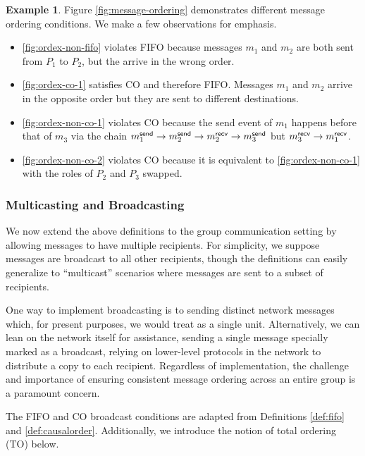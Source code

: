 \documentclass[]             %
{NASA}                       %
\theoremstyle{definition}
\newtheorem{example}[theorem]{Example}
\providecommand{\tightlist}{%
  \setlength{\itemsep}{0pt}\setlength{\parskip}{0pt}}
\begin{document}
\begin{example}
  Figure \ref{fig:message-ordering} demonstrates different message
  ordering conditions. We make a few observations for emphasis.

  \begin{itemize}
    \tightlist
  \item \ref{fig:ordex-non-fifo} violates FIFO because messages $m_1$
    and $m_2$ are both sent from $P_1$ to $P_2$, but the arrive in the wrong order.
  \item \ref{fig:ordex-co-1} satisfies CO and therefore FIFO. Messages
    $m_1$ and $m_2$ arrive in the opposite order but they are sent to
    different destinations.
  \item \ref{fig:ordex-non-co-1} violates CO because the send event of
    $m_1$ happens before that of $m_3$ via the chain
    $m_{1}^{\mathsf{send}} \to m_{2}^{\mathsf{send}} \to m_{2}^{\mathsf{recv}} \to m_{3}^{\mathsf{send}}$ but
    $m_{3}^{\mathsf{recv}} \to m_{1}^{\mathsf{recv}}$.
  \item \ref{fig:ordex-non-co-2} violates CO because it is equivalent to
    \ref{fig:ordex-non-co-1} with the roles of $P_2$ and $P_3$ swapped.
  \end{itemize}
\end{example}

\subsubsection{Multicasting and Broadcasting}
\label{sssec:multicasting}
We now extend the above definitions to the group communication setting
by allowing messages to have multiple recipients. For simplicity, we
suppose messages are broadcast to all other recipients, though the
definitions can easily generalize to ``multicast'' scenarios where
messages are sent to a subset of recipients.

One way to implement broadcasting is to sending distinct network
messages which, for present purposes, we would treat as a single
unit. Alternatively, we can lean on the network itself for assistance,
sending a single message specially marked as a broadcast, relying on
lower-level protocols in the network to distribute a copy to each
recipient. Regardless of implementation, the challenge and importance
of ensuring consistent message ordering across an entire group is a
paramount concern.

The FIFO and CO broadcast conditions are adapted from Definitions
\ref{def:fifo} and \ref{def:causalorder}. Additionally, we introduce
the notion of total ordering (TO) below.
\end{document}
